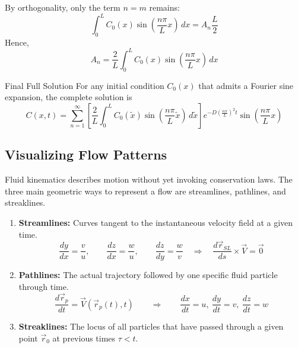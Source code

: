 By orthogonality, only the term $n=m$ remains:
\begin{equation*}
    \int_0^L C_0(x)\sin\left(\frac{n\pi}{L}x\right)\,dx
    =
    A_n \frac{L}{2}
\end{equation*}
Hence,
\begin{equation}
    A_n=\frac{2}{L}\int_0^L C_0(x)\sin\left(\frac{n\pi}{L}x\right)\,dx
\end{equation}

\vspace{0.5cm}
\begin{resultboxnamed}{Final Full Solution}
For any initial condition $C_0(x)$ that admits a Fourier sine expansion, the complete solution is
\begin{equation}
    C(x,t)=
    \sum_{n=1}^{\infty}
    \left[
        \frac{2}{L}
        \int_0^L
        C_0(\tilde{x})
        \sin\left(\frac{n\pi}{L}\tilde{x}\right)\,d\tilde{x}
    \right]
    e^{-D\left(\frac{n\pi}{L}\right)^2 t}
    \sin\left(\frac{n\pi}{L}x\right)
\end{equation}
\end{resultboxnamed}
\subsection{Visualizing Flow Patterns}

Fluid kinematics describes motion without yet invoking conservation laws. The three main geometric ways to represent a flow are streamlines, pathlines, and streaklines.

\begin{enumerate}
    \item \textbf{Streamlines:} Curves tangent to the instantaneous velocity field at a given time.
    \begin{equation}
        \frac{dy}{dx} = \frac{v}{u}, \qquad 
        \frac{dz}{dx} = \frac{w}{u}, \qquad 
        \frac{dz}{dy} = \frac{w}{v}
        \quad \Longrightarrow \quad
        \frac{d\vec{r}_{SL}}{ds} \times \vec{V} = \vec{0}
    \end{equation}

    \item \textbf{Pathlines:} The actual trajectory followed by one specific fluid particle through time.
    \begin{equation}
        \frac{d\vec{r}_p}{dt} = \vec{V}(\vec{r}_p(t), t)
        \qquad \Longrightarrow \qquad
        \frac{dx}{dt} = u, \ \frac{dy}{dt} = v, \ \frac{dz}{dt} = w
    \end{equation}

    \item \textbf{Streaklines:} The locus of all particles that have passed through a given point $\vec{r}_0$ at previous times $\tau < t$.
\end{enumerate}

